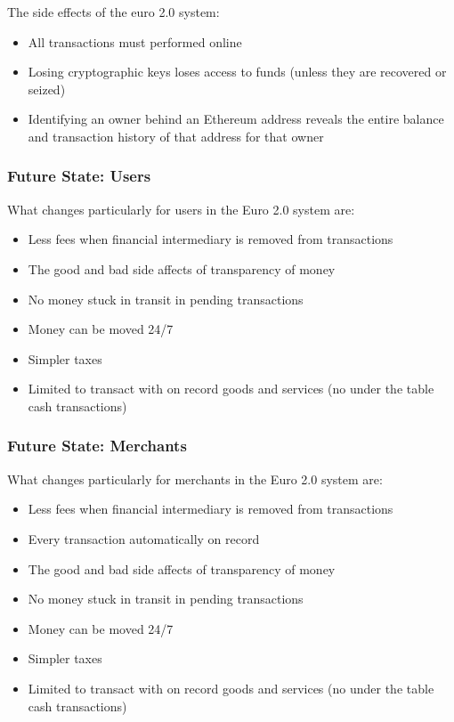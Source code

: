 \documentclass[a4paper,12pt]{article} %
\begin{document}
{The side effects of the euro 2.0 system:

\begin{itemize}
	\item All transactions must performed online
	\item Losing cryptographic keys loses access to funds (unless they are recovered or seized)
	\item Identifying an owner behind an Ethereum address reveals the entire balance and transaction history of that address for that owner
\end{itemize}

\subsubsection{Future State: Users} \label{sssec:4.4:users}

What changes particularly for users in the Euro 2.0 system are:

\begin{itemize}
	\item Less fees when financial intermediary is removed from transactions
	\item The good and bad side affects of transparency of money
	\item No money stuck in transit in pending transactions
	\item Money can be moved 24/7
	\item Simpler taxes
	\item Limited to transact with on record goods and services (no under the table cash transactions)
\end{itemize}

\subsubsection{Future State: Merchants} \label{sssec:4.4:merchants}

What changes particularly for merchants in the Euro 2.0 system are:

\begin{itemize}
	\item Less fees when financial intermediary is removed from transactions
	\item Every transaction automatically on record
	\item The good and bad side affects of transparency of money
	\item No money stuck in transit in pending transactions
	\item Money can be moved 24/7
	\item Simpler taxes
	\item Limited to transact with on record goods and services (no under the table cash transactions)
\end{itemize}

}
\end{document}
